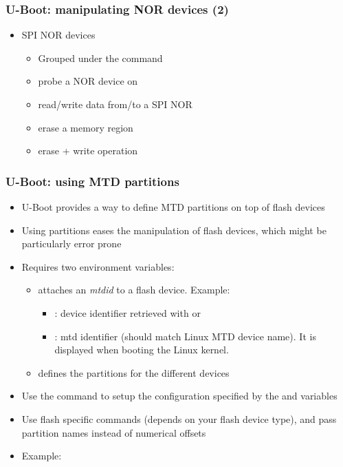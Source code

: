 \begin{frame}
  \frametitle{U-Boot: manipulating NOR devices (2)}
  \begin{itemize}
  \item SPI NOR devices
    \begin{itemize}
    \item Grouped under the  command
    \item {} probe a NOR device on
    \item {} read/write data
       from/to a SPI NOR
    \item {} erase a memory region
    \item {} erase + write operation
    \end{itemize}
  \end{itemize}
\end{frame}

\begin{frame}
  \frametitle{U-Boot: using MTD partitions}
  \begin{itemize}
  \item U-Boot provides a way to define MTD partitions on top of flash
    devices
  \item Using partitions eases the manipulation of flash devices, which might
    be particularly error prone
  \item Requires two environment variables:
    \begin{itemize}
    \item {} attaches an {\em mtdid} to a flash device.
      Example: 
      \begin{itemize}
      \item {}: device identifier retrieved with
         or 
      \item {}: mtd identifier (should match Linux MTD device
        name). It is displayed when booting the Linux kernel.
      \end{itemize}
    \item {} defines the partitions for the different devices
    \end{itemize}
  \item Use the  command to setup the configuration
    specified by the  and  variables
  \item Use flash specific commands (depends on your flash device type),
    and pass partition names instead of numerical offsets
  \item Example: 
  \end{itemize}
\end{frame}


